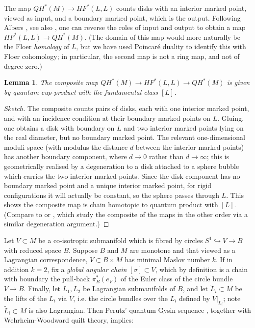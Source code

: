 \documentclass[reqno,10pt]{amsart}
\numberwithin{equation}{section}
\newtheorem{Lemma}[thm]{Lemma}
\theoremstyle{remark}
\begin{document}
The map $QH^*(M) \rightarrow HF^*(L,L)$ counts disks with an interior marked point, viewed as input, and a boundary marked point, which is the output.  Following Albers \cite{Albers}, see also \cite{Abouzaid}, one can reverse the roles of input and output to obtain a map $HF^*(L,L) \rightarrow QH^*(M)$.  (The domain of this map would more naturally be the Floer \emph{homology} of $L$, but we have used Poincar\'e duality to identify this with Floer cohomology; in particular, the second map is not a ring map, and not of degree zero.)

\begin{Lemma}\label{Lem:Composition}
The composite map $QH^*(M) \rightarrow HF^*(L,L) \rightarrow QH^*(M)$ is given by quantum cup-product with the fundamental class $[L]$.
\end{Lemma}

\begin{proof}[Sketch]
The composite counts pairs of disks, each with one interior marked point, and with an incidence condition at their boundary marked points on $L$.  Gluing, one obtains a disk with boundary on $L$ and two interior marked points lying on the real diameter, but no boundary marked point. The relevant one-dimensional moduli space (with modulus the distance $d$ between the interior marked points) has another boundary component, where $d \rightarrow 0$ rather than $d\rightarrow \infty$; this is  geometrically realised by a degeneration to a disk  attached to a sphere bubble which carries the two interior marked points.  Since the disk component has no boundary marked point and a unique interior marked point, for rigid configurations it will actually be constant, so the sphere passes through $L$.  This shows the composite map is chain homotopic to quantum product with $[L]$.  (Compare to \cite[Section 2.4]{BiranCornea:Uniruling} or \cite[Section 6]{Abouzaid}, which study the composite of the maps in the other order via a similar degeneration argument.)
\end{proof}


 Let $V\subset M$ be a co-isotropic submanifold which is fibred by circles $S^1 \hookrightarrow V \rightarrow B$ with reduced space $B$.  Suppose $B$ and $M$ are monotone and that viewed as a Lagrangian correspondence, $V\subset B\times M$ has minimal Maslov number $k$.  If in addition $k=2$, fix a \emph{global angular chain} $[\sigma]\subset V$, which by definition is a chain with boundary the pull-back $\pi_B^*(e_V)$ of the Euler class of the circle bundle $V\rightarrow B$. Finally, let $L_1, L_2$ be Lagrangian submanifolds of $B$, and let $\tilde{L}_i \subset M$ be the lifts of the $L_i$ via $V$, i.e. the circle bundles over the $L_i$ defined by $V|_{L_i}$; note $\tilde{L}_i \subset M$ is also Lagrangian. Then Perutz' quantum Gysin sequence \cite[Sections 1.4 \& 6.1]{Perutz}, together with Wehrheim-Woodward quilt theory,  implies:
\end{document}

